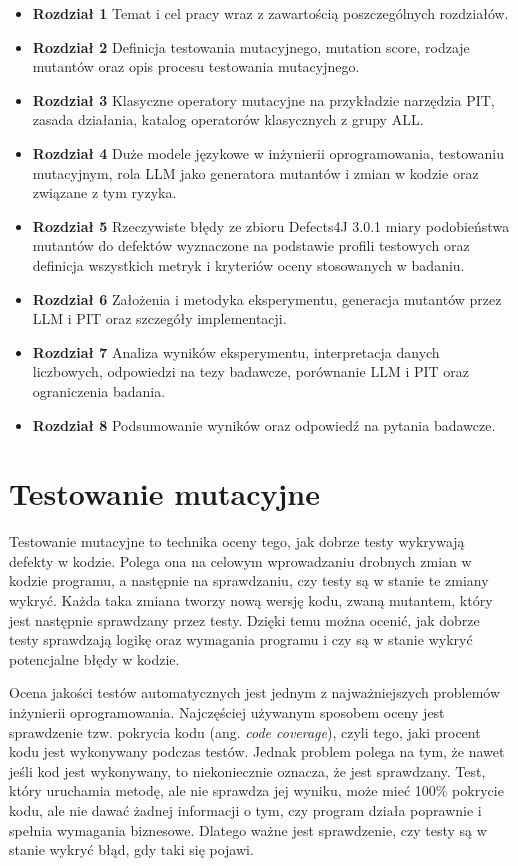\documentclass[12pt,a4paper,oldfontcommands]{memoir}
\theoremstyle{plain}
\theoremstyle{definition}
\theoremstyle{remark}
\begin{document}
    \begin{itemize}
        \item \textbf{Rozdział 1} Temat i cel pracy wraz z zawartością poszczególnych rozdziałów.
        \item \textbf{Rozdział 2} Definicja testowania mutacyjnego, mutation score, rodzaje mutantów oraz opis procesu testowania mutacyjnego.
        \item \textbf{Rozdział 3} Klasyczne operatory mutacyjne na przykładzie narzędzia PIT, zasada działania, katalog operatorów klasycznych z grupy ALL.
        \item \textbf{Rozdział 4} Duże modele językowe w inżynierii oprogramowania, testowaniu mutacyjnym, rola LLM jako generatora mutantów i zmian w kodzie oraz związane z tym ryzyka.
        \item \textbf{Rozdział 5} Rzeczywiste błędy ze zbioru Defects4J 3.0.1 miary podobieństwa mutantów do defektów wyznaczone na podstawie profili testowych oraz definicja wszystkich metryk i kryteriów oceny stosowanych w badaniu.
        \item \textbf{Rozdział 6} Założenia i metodyka eksperymentu, generacja mutantów przez LLM i PIT oraz szczegóły implementacji.
        \item \textbf{Rozdział 7} Analiza wyników eksperymentu, interpretacja danych liczbowych, odpowiedzi na tezy badawcze, porównanie LLM i PIT oraz ograniczenia badania.
        \item \textbf{Rozdział 8} Podsumowanie wyników oraz odpowiedź na pytania badawcze.
    \end{itemize}

    \clearpage
    \openany
    \chapter{Testowanie mutacyjne}
    \openright

    Testowanie mutacyjne to technika oceny tego, jak dobrze testy wykrywają defekty w kodzie.
    Polega ona na celowym wprowadzaniu drobnych zmian w kodzie programu, a następnie na sprawdzaniu, czy testy są w stanie te zmiany wykryć.
    Każda taka zmiana tworzy nową wersję kodu, zwaną mutantem, który jest następnie sprawdzany przez testy.
    Dzięki temu można ocenić, jak dobrze testy sprawdzają logikę oraz wymagania programu i czy są w stanie wykryć potencjalne błędy w kodzie.

    Ocena jakości testów automatycznych jest jednym z najważniejszych problemów inżynierii oprogramowania.
    Najczęściej używanym sposobem oceny jest sprawdzenie tzw. pokrycia kodu (ang. \textit{code coverage}), czyli tego, jaki procent kodu jest wykonywany podczas testów.
    Jednak problem polega na tym, że nawet jeśli kod jest wykonywany, to niekoniecznie oznacza, że jest sprawdzany.
    Test, który uruchamia metodę, ale nie sprawdza jej wyniku, może mieć 100\% pokrycie kodu, ale nie dawać żadnej informacji o tym, czy program działa poprawnie i spełnia wymagania biznesowe.
    Dlatego ważne jest sprawdzenie, czy testy są w stanie wykryć błąd, gdy taki się pojawi.
\end{document}
